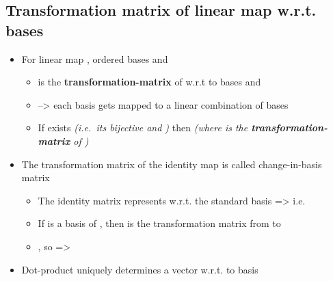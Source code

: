 \subsection*{Transformation matrix of linear map w.r.t.
  bases}

\begin{itemize}

  \item
        For linear map , ordered bases
        and

        \begin{itemize}

          \item
                 is the
                \textbf{transformation-matrix} of  w.r.t to bases 
                and 
          \item
                --\textgreater{} each  basis gets mapped to a
                linear combination of  bases
          \item
                If  exists \emph{(i.e.~its bijective and )}
                then 
                \emph{(where  is the
                  \textbf{transformation-matrix} of )}
        \end{itemize}
  \item
        The transformation matrix of the identity map is called
        change-in-basis matrix

        \begin{itemize}

          \item
                The identity matrix  represents
                 w.r.t. the standard
                basis
                =\textgreater{} i.e.~
          \item
                If 
                is a basis of , then
                 is
                the transformation matrix from  to 
          \item
                , so =\textgreater{}
        \end{itemize}
  \item
        Dot-product uniquely determines a vector w.r.t. to basis


\end{itemize}
